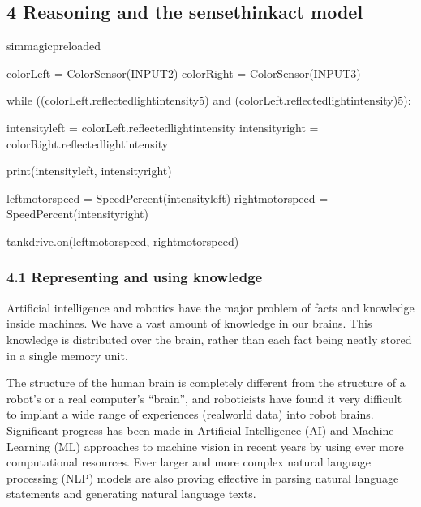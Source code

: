\documentclass[letterpaper,10pt,english]{sphinxmanual}
\begin{document}
\subsection{4 Reasoning and the sense\textendash{}think\textendash{}act model}
\label{\detokenize{content/03_Robot_Lab/Section_00_04:4-Reasoning-and-the-sense_think_act-model}}\label{\detokenize{content/03_Robot_Lab/Section_00_04::doc}}
{
\begin{sphinxVerbatim}[commandchars=\\\{\}]
\llap{\color{nbsphinxin}[ ]:\,\hspace{\fboxrule}\hspace{\fboxsep}}\PYGZpc{}\PYGZpc{}sim\PYGZus{}magic\PYGZus{}preloaded

colorLeft = ColorSensor(INPUT\PYGZus{}2)
colorRight = ColorSensor(INPUT\PYGZus{}3)

while ((colorLeft.reflected\PYGZus{}light\PYGZus{}intensity\PYGZgt{}5)
       and (colorLeft.reflected\PYGZus{}light\PYGZus{}intensity)\PYGZgt{}5):

    intensity\PYGZus{}left = colorLeft.reflected\PYGZus{}light\PYGZus{}intensity
    intensity\PYGZus{}right = colorRight.reflected\PYGZus{}light\PYGZus{}intensity

    print(intensity\PYGZus{}left, intensity\PYGZus{}right)

    left\PYGZus{}motor\PYGZus{}speed = SpeedPercent(intensity\PYGZus{}left)
    right\PYGZus{}motor\PYGZus{}speed = SpeedPercent(intensity\PYGZus{}right)

    tank\PYGZus{}drive.on(left\PYGZus{}motor\PYGZus{}speed, right\PYGZus{}motor\PYGZus{}speed)
\end{sphinxVerbatim}
}


\subsubsection{4.1 Representing and using knowledge}
\label{\detokenize{content/03_Robot_Lab/Section_00_04:4.1-Representing-and-using-knowledge}}
Artificial intelligence and robotics have the major problem of  facts and knowledge inside machines. We have a vast amount of knowledge in our brains. This knowledge is distributed over the brain, rather than each fact being neatly stored in a single memory unit.

The structure of the human brain is completely different from the structure of a robot’s or a real computer’s “brain”, and roboticists have found it very difficult to implant a wide range of experiences (real\sphinxhyphen{}world data) into robot brains. Significant progress has been made in Artificial Intelligence (AI) and Machine Learning (ML) approaches to machine vision in recent years by using ever more computational resources. Ever larger and more complex natural language processing (NLP) models are also
proving effective in parsing natural language statements and generating natural language texts.
\end{document}
